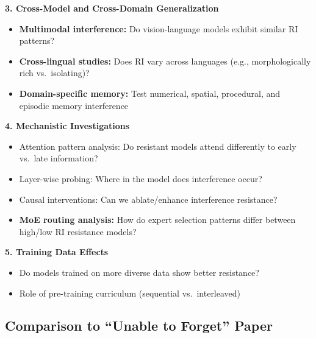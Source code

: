 \documentclass{article}
\begin{document}
\textbf{3. Cross-Model and Cross-Domain Generalization}
\begin{itemize}[itemsep=2pt,topsep=3pt,parsep=0pt]
    \item \textbf{Multimodal interference:} Do vision-language models exhibit similar RI patterns?
    \item \textbf{Cross-lingual studies:} Does RI vary across languages (e.g., morphologically rich vs.\ isolating)?
    \item \textbf{Domain-specific memory:} Test numerical, spatial, procedural, and episodic memory interference
\end{itemize}

\textbf{4. Mechanistic Investigations}
\begin{itemize}[itemsep=2pt,topsep=3pt,parsep=0pt]
    \item Attention pattern analysis: Do resistant models attend differently to early vs.\ late information?
    \item Layer-wise probing: Where in the model does interference occur?
    \item Causal interventions: Can we ablate/enhance interference resistance?
    \item \textbf{MoE routing analysis:} How do expert selection patterns differ between high/low RI resistance models?
\end{itemize}

\textbf{5. Training Data Effects}
\begin{itemize}[itemsep=2pt,topsep=3pt,parsep=0pt]
    \item Do models trained on more diverse data show better resistance?
    \item Role of pre-training curriculum (sequential vs.\ interleaved)
\end{itemize}

\subsection{Comparison to ``Unable to Forget'' Paper}
\end{document}
